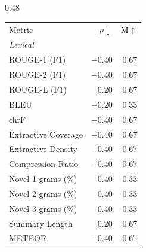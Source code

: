 
\begin{table}[htbp]
\centering
\footnotesize
\setlength{\tabcolsep}{4pt}
\begin{subtable}[t]{0.48\textwidth}
\centering
\begin{tabular}{lrr}
 & & \\
\toprule
Metric & $\rho\downarrow$ & M$\uparrow$ \\
\midrule
\multicolumn{3}{l}{\textit{Lexical}} \\
\midrule
\rowcolor{matchTrue} ROUGE-1 (F1)                          &  $-0.40$ &  0.67 \\
\rowcolor{matchTrue} ROUGE-2 (F1)                          &  $-0.40$ &  0.67 \\
\rowcolor{matchFalse} ROUGE-L (F1)                          &   $0.20$ &  0.67 \\
\rowcolor{matchFalse} BLEU                                  &  $-0.20$ &  0.33 \\
\rowcolor{matchTrue} chrF                                  &  $-0.40$ &  0.67 \\
\rowcolor{matchTrue} Extractive Coverage                   &  $-0.40$ &  0.67 \\
\rowcolor{matchTrue} Extractive Density                    &  $-0.40$ &  0.67 \\
\rowcolor{matchTrue} Compression Ratio                     &  $-0.40$ &  0.67 \\
\rowcolor{matchFalse} Novel 1-grams (\%)                    &   $0.40$ &  0.33 \\
\rowcolor{matchFalse} Novel 2-grams (\%)                    &   $0.40$ &  0.33 \\
\rowcolor{matchFalse} Novel 3-grams (\%)                    &   $0.40$ &  0.33 \\
\rowcolor{matchFalse} Summary Length                        &   $0.20$ &  0.67 \\
\rowcolor{matchTrue} METEOR                                &  $-0.40$ &  0.67 \\

\end{tabular}
\end{subtable}
\end{table}
